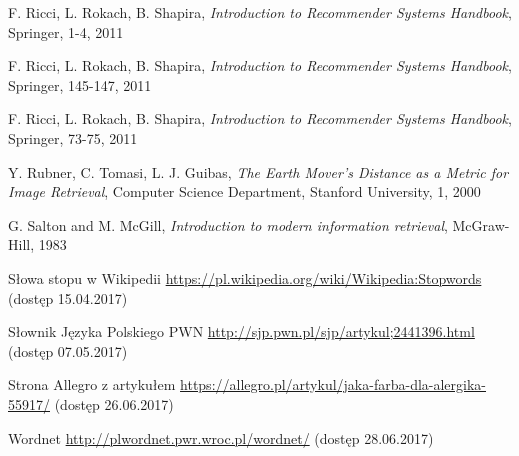 \documentclass[twoside,twocolumn]{article}
\begin{document}
\begin{thebibliography}{99}
		F. Ricci, L. Rokach, B. Shapira,
		\emph{Introduction to Recommender Systems Handbook},
		Springer,
		1-4,
		2011
		
		F. Ricci, L. Rokach, B. Shapira,
		\emph{Introduction to Recommender Systems Handbook},
		Springer,
		145-147,
		2011
		
		F. Ricci, L. Rokach, B. Shapira,
		\emph{Introduction to Recommender Systems Handbook},
		Springer,
		73-75,
		2011
		
		Y. Rubner, C. Tomasi, L. J. Guibas,
		\emph{The Earth Mover's Distance as a Metric for Image Retrieval},
		Computer Science Department, Stanford University,
		1,
		2000	
		
		G. Salton and M. McGill,
		\emph{Introduction to modern information retrieval},
		McGraw-Hill,
		1983
		
		Słowa stopu w Wikipedii
		\url{https://pl.wikipedia.org/wiki/Wikipedia:Stopwords}
		(dostęp 15.04.2017)
		
		Słownik Języka Polskiego PWN
		\url{http://sjp.pwn.pl/sjp/artykul;2441396.html}
		(dostęp 07.05.2017)
		
		Strona Allegro z artykułem
		\url{https://allegro.pl/artykul/jaka-farba-dla-alergika-55917/}
		(dostęp 26.06.2017)
		
		Wordnet
		\url{http://plwordnet.pwr.wroc.pl/wordnet/}
		(dostęp 28.06.2017)
		
		
	\end{thebibliography}
	
	
\end{document}
